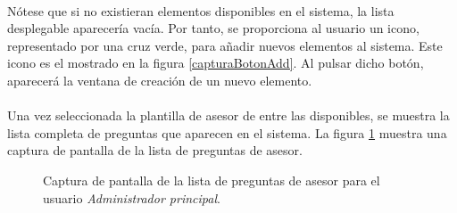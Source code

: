   \paragraph{}Nótese que si no existieran elementos disponibles en el sistema,
  la lista desplegable aparecería vacía. Por tanto, se proporciona al usuario
  un icono, representado por una cruz verde, para añadir nuevos elementos al
  sistema. Este icono es el mostrado en la figura \ref{capturaBotonAdd}. Al
  pulsar dicho botón, aparecerá la ventana de creación de un nuevo elemento.

  \paragraph{}Una vez seleccionada la plantilla de asesor de entre las
  disponibles, se muestra la lista completa de preguntas que aparecen en el
  sistema. La figura \ref{capturaPantallaListaPreguntasAsesorAdminPrincipal}
  muestra una captura de pantalla de la lista de preguntas de asesor.

  \begin{figure}[!ht]
    \begin{center}
      \caption{Captura de pantalla de la lista de preguntas de asesor para el usuario \textit{Administrador principal}.}
      \label{capturaPantallaListaPreguntasAsesorAdminPrincipal}
    \end{center}
  \end{figure}
